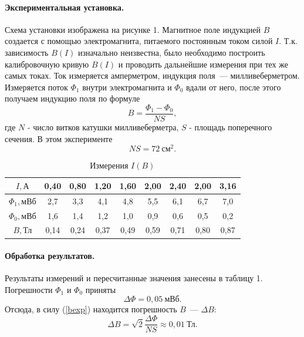 \documentclass[12pt,a4paper]{article}
\begin{document}
\paragraph{Экспериментальная установка.} Схема установки изображена на рисунке 1. Магнитное поле индукцией $B$ создается с помощью электромагнита, питаемого постоянным током силой $I$. Т.к. зависимость $B(I)$ изначально неизвестна, было необходимо построить калибровочную кривую $B(I)$ и проводить дальнейшие измерения при тех же самых токах. Ток измеряется амперметром, индукция поля~--- милливеберметром. Измеряется поток $\Phi_1$ внутри электромагнита и $\Phi_0$ вдали от него, после этого получаем индукцию поля по формуле
\begin{equation}
B = \frac{\Phi_1-\Phi_0}{NS}\label{bexp},
\end{equation}
где $N$ - число витков катушки милливеберметра, $S$ - площадь поперечного сечения. В этом эксперименте
\begin{equation}
NS = 72~\text{см}^2.
\end{equation}
\begin{table}[h!]\centering
\begin{tabular}{|*{9}{c|}}
\hline
$I, \text{А}$&0,40&0,80&1,20&1,60&2,00&2,40&2,00&3,16\\
\hline
$\Phi_1, \text{мВб}$&2,7&3,3&4,1&4,8&5,5&6,1&6,7&7,0\\
\hline
$\Phi_0, \text{мВб}$&1,6&1,4&1,2&1,0&0,9&0,6&0,5&0,2\\
\hline
$B, \text{Тл}$&0,14&0,24&0,37&0,49&0,59&0,71&0,80&0,87\\
\hline
\end{tabular}
\caption{Измерения $I(B)$}
\end{table}
\paragraph{Обработка результатов.} Результаты измерений и пересчитанные значения занесены в таблицу 1. Погрешности $\Phi_1$ и $\Phi_0$ приняты
\begin{equation}
\Delta \Phi = 0,05~\text{мВб}.
\end{equation}
Отсюда, в силу (\ref{bexp}) находится погрешность $B$~--- $\Delta B$:
\begin{equation}
\Delta B = \sqrt{2}\frac{\Delta \Phi}{NS} \approx 0,01~\text{Тл}.
\end{equation}
\end{document}
